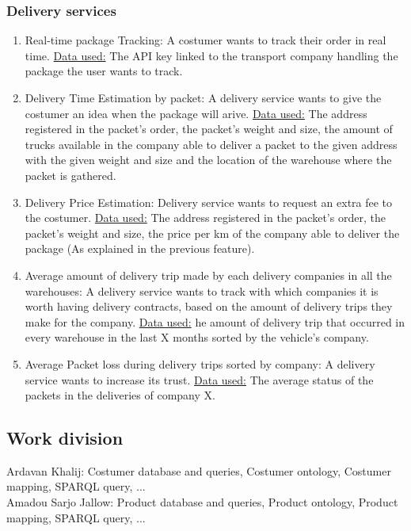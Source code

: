 \documentclass{article}
\begin{document}
\subsubsection{Delivery services}
\begin{enumerate}
  \item Real-time package Tracking: A costumer wants to track their order in real time. \underline{Data used:} The API key linked to the transport company handling the package the user wants to track.
  \item Delivery Time Estimation by packet: A delivery service wants to give the costumer an idea when the package will arive. \underline{Data used:} The address registered in the packet’s order, the packet’s weight and size, the amount of trucks available in the company able to deliver a packet to the given address with the given weight and size and the location of the warehouse where the packet is gathered.
  \item Delivery Price Estimation: Delivery service wants to request an extra fee to the costumer. \underline{Data used:} The address registered in the packet’s order, the packet’s weight and size, the price per km of the company able to deliver the package (As explained in the previous feature).
  \item Average amount of delivery trip made by each delivery companies in all the warehouses: A delivery service wants to track with which companies it is worth having delivery contracts, based on the amount of delivery trips they make for the company. \underline{Data used:} he amount of delivery trip that occurred in every warehouse in the last X months sorted by the vehicle’s company.
  \item Average Packet loss during delivery trips sorted by company: A delivery service wants to increase its trust. \underline{Data used:} The average status of the packets in the deliveries of company X.
\end{enumerate}


\subsection{Work division}
Ardavan Khalij: Costumer database and queries, Costumer ontology, Costumer mapping, SPARQL query, ...
\\

\noindent Amadou Sarjo Jallow: Product database and queries, Product ontology, Product mapping, SPARQL query, ...
\\
\end{document}
